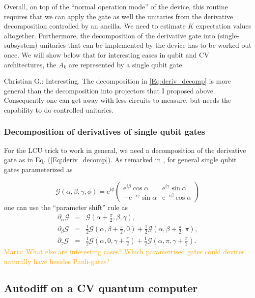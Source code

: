 \documentclass[aps,pra,10pt,twocolumn,groupedaddress,nofootinbib]{revtex4-1}
\theoremstyle{plain}
\newcommand{\e}{\mathrm{e}}
\newcommand{\G}{\mathcal{G}}
\newcommand{\maria}[1]{\textcolor{orange}{Maria: #1}}
\newcommand{\cg}[1]{\textcolor{cyan!80!black}{Christian G.: #1}}
\begin{document}
Overall, on top of the ``normal operation mode'' of the device, this routine requires that we can apply the gate as well the unitaries from the derivative decomposition controlled by an ancilla. We need to estimate $K$ expectation values altogether. Furthermore, the decomposition of the derivative gate into (single-subsystem)  unitaries that can be implemented by the device has to be worked out once. We will show below that for interesting cases in qubit and CV architectures, the $A_k$ are represented by a single qubit gate.

\cg{Interesting. The decomposition in \eqref{Eq:deriv_decomp} is more general than the decomposition into projectors that I proposed above. Consequently one can get away with less circuits to measure, but needs the capability to do controlled unitaries.} 

\subsubsection{Decomposition of derivatives of single qubit gates}
For the LCU trick to work in general, we need a decomposition of the derivative gate as in Eq. (\ref{Eq:deriv_decomp}). As remarked in \cite{schuld18cc}, for general single qubit gates parameterized as

\begin{equation*} \label{eq:1q:parametrization}
\G (\alpha,\beta, \gamma, \phi ) = \e^{i\phi} \begin{pmatrix} \e^{i\beta} \cos \alpha &  \e^{i\gamma} \sin \alpha\\ -\e^{-i\gamma} \sin \alpha &  \e^{-i\beta} \cos \alpha \end{pmatrix}
\end{equation*}
one can use the ``parameter shift'' rule as
\begin{eqnarray*}
 \partial_{\alpha} \G  &=&  \G(\alpha + \frac{\pi}{2}, \beta, \gamma ),   \\
 \partial_{\beta} \G &=& \frac{1}{2} \G(\alpha, \beta + \frac{\pi}{2} , 0  ) + \frac{1}{2}  \G(\alpha, \beta + \frac{\pi}{2} , \pi ),  \\
\partial_{\gamma} \G &=& \frac{1}{2} \G(\alpha, 0, \gamma + \frac{\pi}{2}  ) + \frac{1}{2}  \G(\alpha, \pi, \gamma + \frac{\pi}{2} ).
\end{eqnarray*}
\maria{What else are interesting cases? Which parametrised gates could devices naturally have besides Pauli-gates?}


\subsection{Autodiff on a CV quantum computer}
\end{document}
